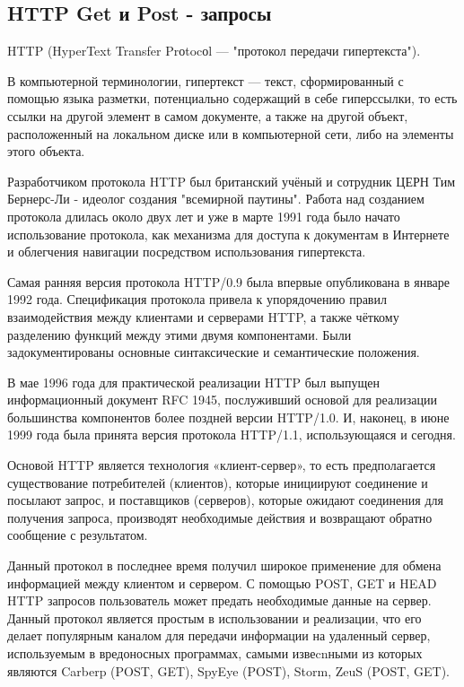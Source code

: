 \subsection{HTTP Get и Post - запросы}

HTTP (HyperText Transfer Prоtocоl — "протокол передачи гипертекста"). 

В компьютерной терминологии, гипертекст — текст, сформированный с помощью языка разметки, потенциально содержащий в себе гиперссылки, то есть ссылки на другой элемент в самом документе, а также на другой объект, расположенный на локальном диске или в компьютерной сети, либо на элементы этого объекта.

Разработчиком протокола HTTP был британский учёный и сотрудник ЦЕРН Тим Бернерс-Ли - идеолог создания "всемирной паутины". Работа над созданием протокола длилась около двух лет и уже в марте 1991 года было начато использование протокола, как механизма для доступа к документам в Интернете и облегчения навигации посредством использования гипертекста.

Самая ранняя версия протокола HTTP/0.9 была впервые опубликована в январе 1992 года. Спецификация протокола привела к упорядочению правил взаимодействия между клиентами и серверами HTTP, а также чёткому разделению функций между этими двумя компонентами. Были задокументированы основные синтаксические и семантические положения.

В мае 1996 года для практической реализации HTTP был выпущен информационный документ RFC 1945, послуживший основой для реализации большинства компонентов более поздней версии HTTP/1.0. И, наконец, в июне 1999 года была принята версия протокола HTTP/1.1, использующаяся и сегодня.

Основой HTTP является технология «клиент-сервер», то есть предполагается существование потребителей (клиентов), которые инициируют соединение и посылают запрос, и поставщиков (серверов), которые ожидают соединения для получения запроса, производят необходимые действия и возвращают обратно сообщение с результатом.

Данный протокол в последнее время получил широкое применение для обмена информацией между клиентом и сервером. С помощью POST, GET и HEAD HTTP запросов пользователь может предать необходимые данные на сервер. Данный протокол является простым в использовании и реализации, что его делает популярным каналом для передачи информации на удаленный сервер, используемым в вредоносных программах, самыми извеcnными из которых являются Carberp (POST, GET), SpyEye (POST), Storm, ZeuS (POST, GET).

